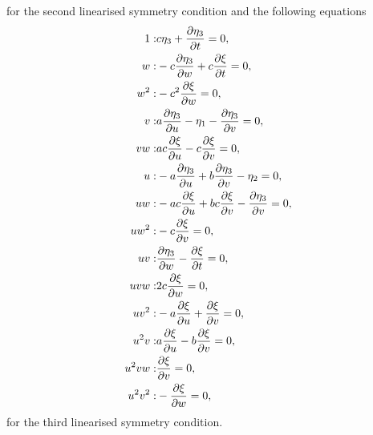for the second linearised symmetry condition and the following equations
\begin{align}
1:&c \eta_3 + \pdv{\eta_3}{t}=0,\\
w:&- c \pdv{\eta_3}{w} + c \pdv{\xi}{t}=0,\\
w^{2}:&- c^{2} \pdv{\xi}{w}=0,\\
v:&a \pdv{\eta_3}{u} - \eta_1 - \pdv{\eta_3}{v}=0,\\
v w:&a c \pdv{\xi}{u} - c \pdv{\xi}{v}=0,\\
u:&- a \pdv{\eta_3}{u} + b \pdv{\eta_3}{v} - \eta_2=0,\\
u w:&- a c \pdv{\xi}{u} + b c \pdv{\xi}{v} - \pdv{\eta_3}{v}=0,\\
u w^{2}:&- c \pdv{\xi}{v}=0,\\
u v:&\pdv{\eta_3}{w} - \pdv{\xi}{t}=0,\\
u v w:&2 c \pdv{\xi}{w}=0,\\
u v^{2}:&- a \pdv{\xi}{u} + \pdv{\xi}{v}=0,\\
u^{2} v:&a \pdv{\xi}{u} - b \pdv{\xi}{v}=0,\\
u^{2} v w:&\pdv{\xi}{v}=0,\\
u^{2} v^{2}:&- \pdv{\xi}{w}=0,
\end{align}
for the third linearised symmetry condition.